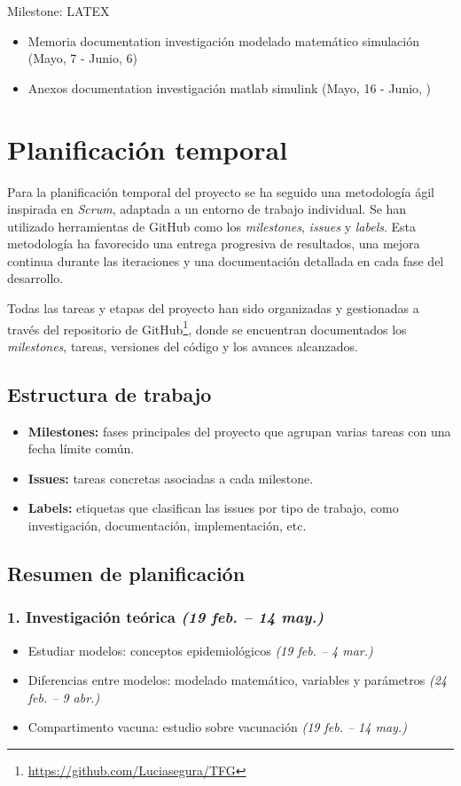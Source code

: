 Milestone: LATEX
\begin{itemize}
    \item Memoria documentation investigación modelado matemático simulación (Mayo, 7 - Junio, 6)
    \item Anexos documentation investigación matlab simulink (Mayo, 16 -  Junio, )
\end{itemize}

\section{Planificación temporal}

Para la planificación temporal del proyecto se ha seguido una metodología ágil inspirada en \textit{Scrum}, adaptada a un entorno de trabajo individual. Se han utilizado herramientas de GitHub como los \textit{milestones}, \textit{issues} y \textit{labels}. Esta metodología ha favorecido una entrega progresiva de resultados, una mejora continua durante las iteraciones y una documentación detallada en cada fase del desarrollo.

Todas las tareas y etapas del proyecto han sido organizadas y gestionadas a través del repositorio de GitHub\footnote{\url{https://github.com/Luciasegura/TFG}}, donde se encuentran documentados los \textit{milestones}, tareas, versiones del código y los avances alcanzados.

\subsection*{Estructura de trabajo}

\begin{itemize}
    \item \textbf{Milestones:} fases principales del proyecto que agrupan varias tareas con una fecha límite común.
    \item \textbf{Issues:} tareas concretas asociadas a cada milestone.
    \item \textbf{Labels:} etiquetas que clasifican las issues por tipo de trabajo, como investigación, documentación, implementación, etc.
\end{itemize}

\subsection*{Resumen de planificación}

\subsubsection*{1. Investigación teórica \hfill \textnormal{\textit{(19 feb. – 14 may.)}}}
\begin{itemize}
    \item Estudiar modelos: conceptos epidemiológicos \hfill \textit{(19 feb. – 4 mar.)}
    \item Diferencias entre modelos: modelado matemático, variables y parámetros \hfill \textit{(24 feb. – 9 abr.)}
    \item Compartimento vacuna: estudio sobre vacunación \hfill \textit{(19 feb. – 14 may.)}
\end{itemize}

